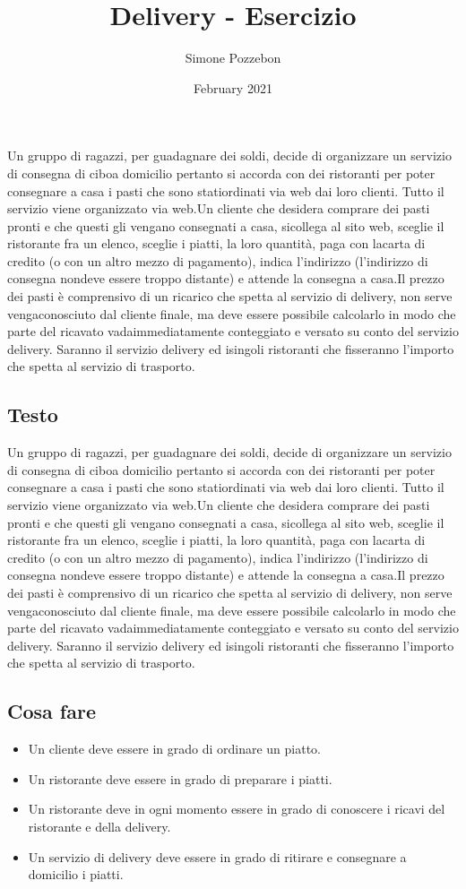 \documentclass[a4paper, 12pt]{article}
\title{Delivery - Esercizio}
\author{Simone Pozzebon}
\date{February 2021}
\begin{document}
\maketitle Un gruppo di ragazzi, per guadagnare dei soldi, decide di organizzare un servizio di consegna di ciboa domicilio pertanto si accorda con dei ristoranti per poter consegnare a casa i pasti che sono statiordinati via web dai loro clienti. Tutto il servizio viene organizzato via web.Un cliente che desidera comprare dei pasti pronti e che questi gli vengano consegnati a casa, sicollega al sito web, sceglie il ristorante fra un elenco, sceglie i piatti, la loro quantità, paga con lacarta di credito (o con un altro mezzo di pagamento), indica l’indirizzo (l’indirizzo di consegna nondeve essere troppo distante) e attende la consegna a casa.Il prezzo dei pasti è comprensivo di un ricarico che spetta al servizio di delivery, non serve vengaconosciuto dal cliente finale, ma deve essere possibile calcolarlo in modo che parte del ricavato vadaimmediatamente conteggiato e versato su conto del servizio delivery. Saranno il servizio delivery ed isingoli ristoranti che fisseranno l’importo che spetta al servizio di trasporto.

\subsection{Testo}
Un gruppo di ragazzi, per guadagnare dei soldi, decide di organizzare un servizio di consegna di ciboa domicilio pertanto si accorda con dei ristoranti per poter consegnare a casa i pasti che sono statiordinati via web dai loro clienti. Tutto il servizio viene organizzato via web.Un cliente che desidera comprare dei pasti pronti e che questi gli vengano consegnati a casa, sicollega al sito web, sceglie il ristorante fra un elenco, sceglie i piatti, la loro quantità, paga con lacarta di credito (o con un altro mezzo di pagamento), indica l’indirizzo (l’indirizzo di consegna nondeve essere troppo distante) e attende la consegna a casa.Il prezzo dei pasti è comprensivo di un ricarico che spetta al servizio di delivery, non serve vengaconosciuto dal cliente finale, ma deve essere possibile calcolarlo in modo che parte del ricavato vadaimmediatamente conteggiato e versato su conto del servizio delivery. Saranno il servizio delivery ed isingoli ristoranti che fisseranno l’importo che spetta al servizio di trasporto.

\subsection{Cosa fare}
\begin{itemize}
    \item Un cliente deve essere in grado di ordinare un piatto.
    \item Un ristorante deve essere in grado di preparare i piatti.
    \item Un ristorante deve in ogni momento essere in grado di conoscere i ricavi del ristorante e della delivery.
    \item Un servizio di delivery deve essere in grado di ritirare e consegnare a domicilio i piatti.
\end{itemize}
\end{document}
